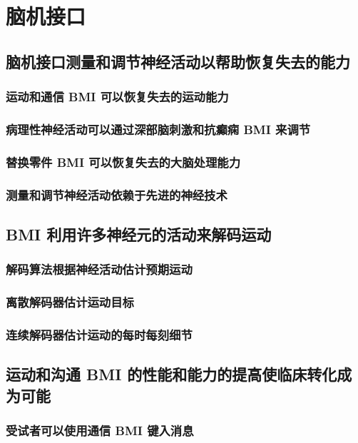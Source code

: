 \chapter{脑机接口}

\section{脑机接口测量和调节神经活动以帮助恢复失去的能力}
\subsection{运动和通信 BMI 可以恢复失去的运动能力}
\subsection{病理性神经活动可以通过深部脑刺激和抗癫痫 BMI 来调节}
\subsection{替换零件 BMI 可以恢复失去的大脑处理能力}
\subsection{测量和调节神经活动依赖于先进的神经技术}

\section{BMI 利用许多神经元的活动来解码运动}
\subsection{解码算法根据神经活动估计预期运动}
\subsection{离散解码器估计运动目标}
\subsection{连续解码器估计运动的每时每刻细节}

\section{运动和沟通 BMI 的性能和能力的提高使临床转化成为可能}
\subsection{受试者可以使用通信 BMI 键入消息}
